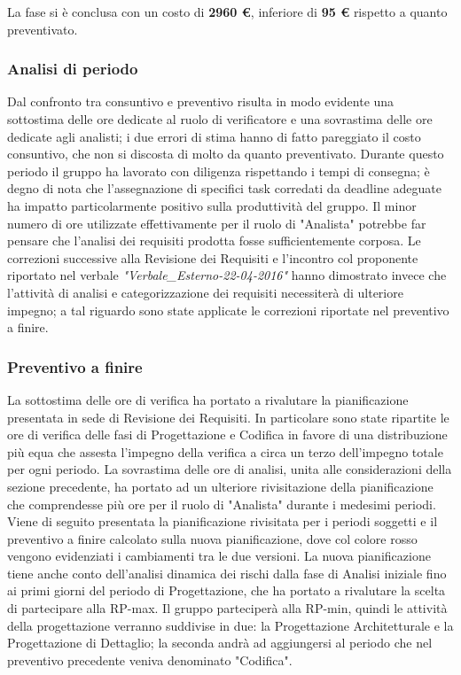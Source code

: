 \documentclass[a4paper,11pt]{article}
\begin{document}
	La fase si è conclusa con un costo di \textbf{2960 \euro}, inferiore di \textbf{95 \euro} rispetto a quanto preventivato.
	
	\subsubsection{Analisi di periodo}
	Dal confronto tra consuntivo e preventivo risulta in modo evidente una sottostima delle ore dedicate al ruolo di verificatore e una sovrastima delle ore dedicate agli analisti; i due errori di stima hanno di fatto pareggiato il costo consuntivo, che non si discosta di molto da quanto preventivato. Durante questo periodo il gruppo ha lavorato con diligenza rispettando i tempi di consegna; è degno di nota che l'assegnazione di specifici task corredati da deadline adeguate ha impatto particolarmente positivo sulla produttività del gruppo. \newline
	Il minor numero di ore utilizzate effettivamente per il ruolo di "Analista" potrebbe far pensare che l'analisi dei requisiti prodotta fosse sufficientemente corposa. Le correzioni successive alla Revisione dei Requisiti e l'incontro col proponente riportato nel verbale \emph{"Verbale\_Esterno-22-04-2016"} hanno dimostrato invece che l'attività di analisi e categorizzazione dei requisiti necessiterà di ulteriore impegno; a tal riguardo sono state applicate le correzioni riportate nel preventivo a finire.
	\subsubsection{Preventivo a finire}
	\label{Preventivo a finire}
	La sottostima delle ore di verifica ha portato a rivalutare la pianificazione presentata in sede di Revisione dei Requisiti. In particolare sono state ripartite le ore di verifica delle fasi di Progettazione e Codifica in favore di una distribuzione più equa che assesta l'impegno della verifica a circa un terzo dell'impegno totale per ogni periodo. La sovrastima delle ore di analisi, unita alle considerazioni della sezione precedente, ha portato ad un ulteriore rivisitazione della pianificazione che comprendesse più ore per il ruolo di "Analista" durante i medesimi periodi.
	Viene di seguito presentata la pianificazione rivisitata per i periodi soggetti e il preventivo a finire calcolato sulla nuova pianificazione, dove col colore rosso vengono evidenziati i cambiamenti tra le due versioni. La nuova pianificazione tiene anche conto dell'analisi dinamica dei rischi dalla fase di Analisi iniziale fino ai primi giorni del periodo di Progettazione, che ha portato a rivalutare la scelta di partecipare alla RP-max. Il gruppo parteciperà alla RP-min, quindi le attività della progettazione verranno suddivise in due: la Progettazione Architetturale e la Progettazione di Dettaglio; la seconda andrà ad aggiungersi al periodo che nel preventivo precedente veniva denominato "Codifica".
	
\end{document}
